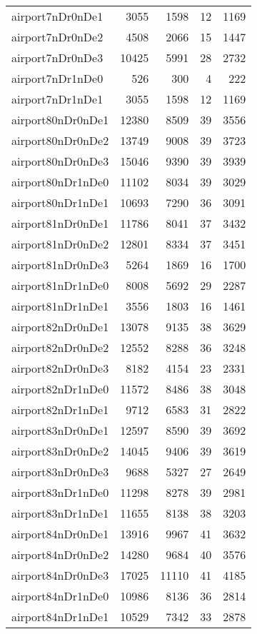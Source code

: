\begin{longtable}{lrrrr}
airport7nDr0nDe1 & 3055 & 1598 & 12 & 1169 \\
airport7nDr0nDe2 & 4508 & 2066 & 15 & 1447 \\
airport7nDr0nDe3 & 10425 & 5991 & 28 & 2732 \\
airport7nDr1nDe0 & 526 & 300 & 4 & 222 \\
airport7nDr1nDe1 & 3055 & 1598 & 12 & 1169 \\
airport80nDr0nDe1 & 12380 & 8509 & 39 & 3556 \\
airport80nDr0nDe2 & 13749 & 9008 & 39 & 3723 \\
airport80nDr0nDe3 & 15046 & 9390 & 39 & 3939 \\
airport80nDr1nDe0 & 11102 & 8034 & 39 & 3029 \\
airport80nDr1nDe1 & 10693 & 7290 & 36 & 3091 \\
airport81nDr0nDe1 & 11786 & 8041 & 37 & 3432 \\
airport81nDr0nDe2 & 12801 & 8334 & 37 & 3451 \\
airport81nDr0nDe3 & 5264 & 1869 & 16 & 1700 \\
airport81nDr1nDe0 & 8008 & 5692 & 29 & 2287 \\
airport81nDr1nDe1 & 3556 & 1803 & 16 & 1461 \\
airport82nDr0nDe1 & 13078 & 9135 & 38 & 3629 \\
airport82nDr0nDe2 & 12552 & 8288 & 36 & 3248 \\
airport82nDr0nDe3 & 8182 & 4154 & 23 & 2331 \\
airport82nDr1nDe0 & 11572 & 8486 & 38 & 3048 \\
airport82nDr1nDe1 & 9712 & 6583 & 31 & 2822 \\
airport83nDr0nDe1 & 12597 & 8590 & 39 & 3692 \\
airport83nDr0nDe2 & 14045 & 9406 & 39 & 3619 \\
airport83nDr0nDe3 & 9688 & 5327 & 27 & 2649 \\
airport83nDr1nDe0 & 11298 & 8278 & 39 & 2981 \\
airport83nDr1nDe1 & 11655 & 8138 & 38 & 3203 \\
airport84nDr0nDe1 & 13916 & 9967 & 41 & 3632 \\
airport84nDr0nDe2 & 14280 & 9684 & 40 & 3576 \\
airport84nDr0nDe3 & 17025 & 11110 & 41 & 4185 \\
airport84nDr1nDe0 & 10986 & 8136 & 36 & 2814 \\
airport84nDr1nDe1 & 10529 & 7342 & 33 & 2878 \\

\end{longtable}
